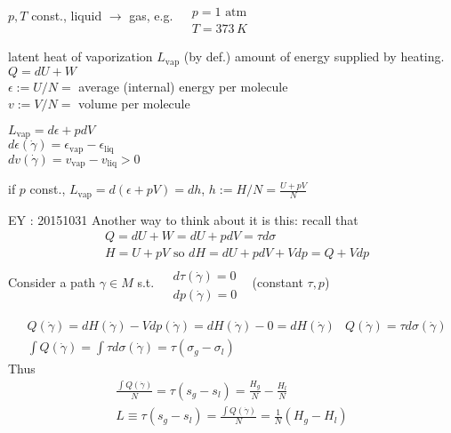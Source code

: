 \documentclass[10pt]{amsart}
\begin{document}
\begin{multicols*}{2}
$p,T$ const., liquid $\to $ gas, e.g. $ \begin{aligned} & \quad \\
  & p = 1 \text{ atm } \\
  & T = 373 \, K \end{aligned}$

latent heat of vaporization $L_{\text{vap}}$ (by def.) amount of energy supplied by heating.  \\
$Q = dU + W$ \\
$\epsilon := U/N = $ average (internal) energy per molecule  \\
$v:= V/N = $ volume per molecule 

$L_{\text{vap}} = d\epsilon + p dV$ \\
\phantom{\quad \, } $d\epsilon(\dot{\gamma}) = \epsilon_{\text{vap}} - \epsilon_{\text{liq}}$ \\
\phantom{\quad \, } $dv(\dot{\gamma}) = v_{\text{vap}} - v_{\text{liq}} >0$

if $p$ const., $L_{\text{vap}} = d(\epsilon + pV) = dh$, $h:= H/N = \frac{ U + pV}{N}$

EY : 20151031 Another way to think about it is this: recall that
\[
\begin{aligned}
  & Q = dU + W = dU + pdV = \tau d\sigma \\ 
  & H = U + pV \text{ so } dH = dU + pdV + Vdp = Q + Vdp
\end{aligned}
\]
Consider a path $\gamma \in M$ s.t. $\begin{aligned} & \quad \\
  & d\tau(\dot{\gamma}) = 0 \\
  & dp(\dot{\gamma}) = 0 \end{aligned}$ \quad \, (constant $\tau,p$)

\[
\begin{aligned}
  & Q(\dot{\gamma}) = dH(\dot{\gamma}) - Vdp(\dot{\gamma}) = dH(\dot{\gamma}) - 0 = dH(\dot{\gamma})
  & Q(\dot{\gamma}) = \tau d\sigma(\dot{\gamma}) \\ 
  & \int Q(\dot{\gamma}) = \int \tau d\sigma(\dot{\gamma}) = \tau(\sigma_g - \sigma_l)
\end{aligned}
\]
Thus
\[
\begin{gathered}
  \frac{ \int Q(\dot{\gamma})}{ N} = \tau (s_g - s_l ) = \frac{H_g}{N} - \frac{H_l}{N} \\ 
  L \equiv \tau(s_g - s_l) = \frac{ \int Q(\dot{\gamma})}{ N} = \frac{1}{N} (H_g -H_l)
\end{gathered}
\]


\end{multicols*}
\end{document}

